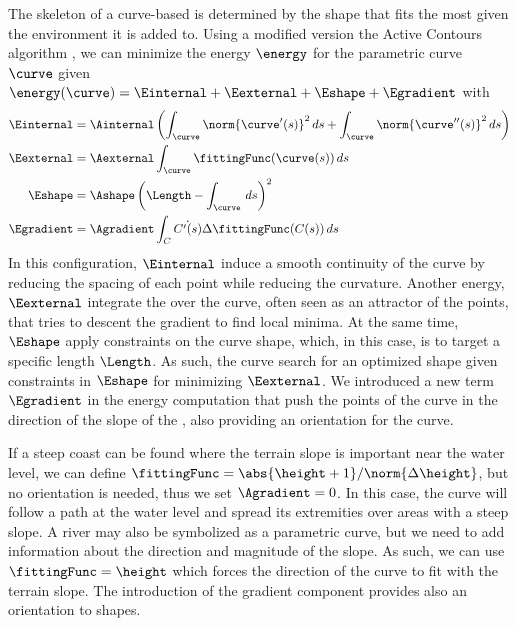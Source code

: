 
The skeleton of a curve-based  is determined by the shape that fits the most given the environment it is added to. 
Using a modified version the Active Contours algorithm \cite{Kass1988}, we can minimize the energy $\energy$ for the parametric curve $\curve$ given $\energy(\curve) = \Einternal + \Eexternal + \Eshape + \Egradient$ with  
\begin{align}
    \label{eq:internal-energy-equation}
    \Einternal &= \Ainternal \left( \int_{\curve}{ \norm{\curve'(s)}^2 \, ds} + \int_{\curve}{ \norm{\curve''(s)}^2 \, ds}  \right) \\
    \Eexternal &= \Aexternal \int_{\curve}{ \fittingFunc(\curve(s)) \, ds } \\
    \Eshape    &= \Ashape \left( \Length - \int_{\curve}{ \, ds } \right)^2 \\
    \Egradient &= \Agradient \int_{C}{ \dot{C'(s)}{\Delta \fittingFunc(C(s))} \, ds }
\end{align}
In this configuration, $\Einternal$ induce a smooth continuity of the curve by reducing the spacing of each point while reducing the curvature. Another energy, $\Eexternal$ integrate the  over the curve, often seen as an attractor of the points, that tries to descent the gradient to find local minima. At the same time, $\Eshape$ apply constraints on the curve shape, which, in this case, is to target a specific length $\Length$. As such, the curve search for an optimized shape given constraints in $\Eshape$ for minimizing $\Eexternal$. We introduced a new term $\Egradient$ in the energy computation that push the points of the curve in the direction of the slope of the , also providing an orientation for the curve.

If a steep coast can be found where the terrain slope is important near the water level, we can define $\fittingFunc = \abs{\height + 1} / \norm{\Delta \height}$, but no orientation is needed, thus we set $\Agradient = 0$. In this case, the curve will follow a path at the water level and spread its extremities over areas with a steep slope. A river may also be symbolized as a parametric curve, but we need to add information about the direction and magnitude of the slope.  As such, we can use $\fittingFunc = \height$ which forces the direction of the curve to fit with the terrain slope. The introduction of the gradient component provides also an orientation to shapes.

